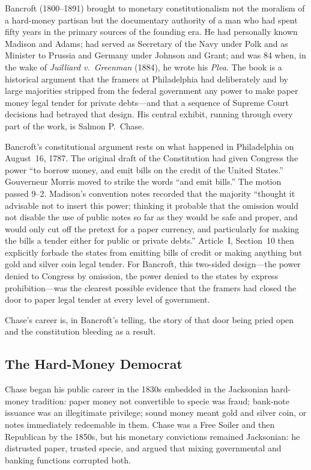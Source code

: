 \documentclass[12pt]{article}
\begin{document}
Bancroft (1800--1891) brought to monetary constitutionalism not the
moralism of a hard-money partisan but the documentary authority of a man
who had spent fifty years in the primary sources of the founding era.
He had personally known Madison and Adams; had served as Secretary of
the Navy under Polk and as Minister to Prussia and Germany under Johnson
and Grant; and was 84 when, in the wake of \textit{Juilliard v.\
Greenman} (1884), he wrote his \textit{Plea}.  The book is a
historical argument that the framers at Philadelphia had
deliberately and by large majorities stripped from the federal
government any power to make paper money legal tender for private
debts---and that a sequence of Supreme Court decisions had betrayed that
design.  His central exhibit, running through every part of the work,
is Salmon P.\ Chase.

Bancroft's constitutional argument rests on what happened in Philadelphia
on August~16, 1787.  The original draft of the Constitution had given
Congress the power ``to borrow money, and emit bills on the credit of
the United States.''  Gouverneur Morris moved to strike the words ``and
emit bills.''  The motion passed 9--2.  Madison's convention notes
recorded that the majority ``thought it advisable not to insert this
power; thinking it probable that the omission would not disable the use
of public notes so far as they would be safe and proper, and would only
cut off the pretext for a paper currency, and particularly for making
the bills a tender either for public or private debts.''  Article~I,
Section~10 then explicitly forbade the states from emitting bills of
credit or making anything but gold and silver coin legal tender.  For
Bancroft, this two-sided design---the power denied to Congress by
omission, the power denied to the states by express prohibition---was
the clearest possible evidence that the framers had closed the door to
paper legal tender at every level of government.

Chase's career is, in Bancroft's telling, the story of that door being
pried open and the constitution bleeding as a result.

\subsection{The Hard-Money Democrat}

Chase began his public career in the 1830s embedded in the
Jacksonian hard-money tradition: paper money not convertible to specie
was fraud; bank-note issuance was an illegitimate privilege; sound money
meant gold and silver coin, or notes immediately redeemable in them.
Chase was a Free Soiler and then Republican by the 1850s, but his
monetary convictions remained Jacksonian: he distrusted paper, trusted
specie, and argued that mixing governmental and banking functions
corrupted both.
\end{document}
